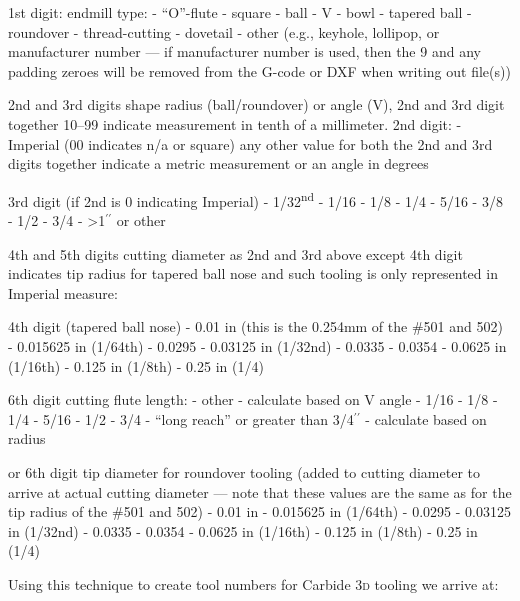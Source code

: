 \documentclass{ltxdoc}
\begin{document}
\begin{outline}
\1 1st digit: endmill type:
 - ``O''-flute 
 - square
 - ball
 - V
 - bowl
 - tapered ball
 - roundover
 - thread-cutting
 - dovetail
 - other (e.g., keyhole, lollipop, or manufacturer number --- if manufacturer number is used, then the 9 and any padding zeroes will be removed from the G-code or DXF when writing out file(s))

\1 2nd and 3rd digits shape radius (ball/roundover) or angle (V), 2nd and 3rd digit together 10--99 indicate measurement in tenth of a millimeter. 2nd digit:
 - Imperial (00 indicates n/a or square) 
\2 any other value for both the 2nd and 3rd digits together indicate a metric measurement or an angle in degrees

\1 3rd digit (if 2nd is 0 indicating Imperial)
 - 1/32\textsuperscript{nd}
 - 1/16
 - 1/8
 - 1/4
 - 5/16
 - 3/8
  - 1/2
 - 3/4
 - >1$^{\prime\prime}$ or other

\1 4th and 5th digits cutting diameter as 2nd and 3rd above except 4th digit indicates tip radius for tapered ball nose and such tooling is only represented in Imperial measure:

\1 4th digit (tapered ball nose)
 - 0.01 in (this is the 0.254mm of the \#501 and 502)
 - 0.015625 in (1/64th)
 - 0.0295
 - 0.03125 in (1/32nd)
 - 0.0335
 - 0.0354
 - 0.0625 in (1/16th)
 - 0.125 in (1/8th)
 - 0.25 in (1/4)

\1 6th digit cutting flute length:
 - other
 - calculate based on V angle
 - 1/16
 - 1/8
 - 1/4
 - 5/16
 - 1/2
  - 3/4
 - ``long reach'' or greater than 3/4$^{\prime\prime}$
 - calculate based on radius

\1 or 6th digit tip diameter for roundover tooling (added to cutting diameter to arrive at actual cutting diameter --- note that these values are the same as for the tip radius of the \#501 and 502)
 - 0.01 in 
 - 0.015625 in (1/64th)
 - 0.0295
 - 0.03125 in (1/32nd)
 - 0.0335
 - 0.0354
 - 0.0625 in (1/16th)
 - 0.125 in (1/8th)
 - 0.25 in (1/4)

\end{outline}

Using this technique to create tool numbers for Carbide \textsc{3d} tooling we arrive at:
\end{document}
